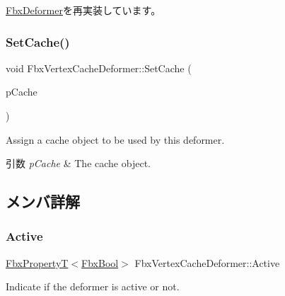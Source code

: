 \hyperlink{class_fbx_deformer_ac3f5a3eb2dda62397fc667004d798319}{Fbx\+Deformer}を再実装しています。

\mbox{\label{class_fbx_vertex_cache_deformer_a773ff8a21ec72cf5e18f4b29ea86f7bc}} 
\subsubsection{\texorpdfstring{Set\+Cache()}{SetCache()}}
{\footnotesize\ttfamily void Fbx\+Vertex\+Cache\+Deformer\+::\+Set\+Cache (\begin{DoxyParamCaption}\item[{\hyperlink{class_fbx_cache}{Fbx\+Cache} $\ast$}]{p\+Cache }\end{DoxyParamCaption})}

Assign a cache object to be used by this deformer. 
\begin{DoxyParams}{引数}
{\em p\+Cache} & The cache object. \\
\hline
\end{DoxyParams}


\subsection{メンバ詳解}
\mbox{\label{class_fbx_vertex_cache_deformer_a12288746509d99e897af0786ec6fc33f}} 
\subsubsection{\texorpdfstring{Active}{Active}}
{\footnotesize\ttfamily \hyperlink{class_fbx_property_t}{Fbx\+PropertyT}$<$\hyperlink{fbxtypes_8h_a92e0562b2fe33e76a242f498b362262e}{Fbx\+Bool}$>$ Fbx\+Vertex\+Cache\+Deformer\+::\+Active}



Indicate if the deformer is active or not. 

\mbox{\label{class_fbx_vertex_cache_deformer_a2f320220fffbd0b7f20b074d7b2de4fb}} 
